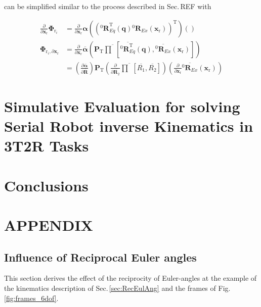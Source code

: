 \documentclass[twocolumn,10pt]{IFTOMM}
\newcommand{\bm}[1]{\boldsymbol{#1}}
\newcommand{\rotmat}[2]{{{ }^{#1}\boldsymbol{R}}_{#2}}
\newcommand{\transp}[0]{{\mathrm{T}}}
\begin{document}
can be simplified similar to the process described in Sec.\,REF with

\begin{align}
\frac{\partial}{\partial \bm{x}_{\mathrm{r}}}\bm{\Phi}_{\mathrm{r}_i}
&=
\frac{\partial}{\partial \bm{x}_{\mathrm{r}}} \bm{\alpha}\left((\rotmat{0}{Eq}^\transp(\bm{q}) \rotmat{0}{Ex}(\bm{x}_{\mathrm{r}}))^\transp\right) (\label{equ:grad_Phi_x}) \\
\bm{\Phi}_{\mathrm{r}_i,\partial \bm{x}_{\mathrm{r}}} 
&=
\frac{\partial}{\partial \bm{x}_{\mathrm{r}}} \overline{\bm{\alpha}}\left(
\bm{P}_{\mathrm{T}}
\overline{\prod}\left[ \overline{\rotmat{0}{Eq}^\transp}(\bm{q}), \overline{\rotmat{0}{Ex}}(\bm{x}_{\mathrm{r}})\right]\right) \nonumber \\
&=
\left(\frac{\partial \overline{\bm{\alpha}}}{\partial \overline{\bm{R}}}\right)
\bm{P}_{\mathrm{T}}
\left(\frac{\partial }{\partial \overline{\bm{R}_2}}
\overline{\prod}\left[ \overline{R_1}, \overline{R_2}\right]\right)
\left(\frac{\partial}{\partial \bm{x}_{\mathrm{r}}} \overline{\rotmat{0}{Ex}}(\bm{x}_{\mathrm{r}})\right) \nonumber
\end{align}





\section{Simulative Evaluation for solving Serial Robot inverse Kinematics in 3T2R Tasks}
\label{sec:SimEvalSerRobIK}

\section{Conclusions}
\label{sec:Conclusion}

\section{APPENDIX}

\subsection{Influence of Reciprocal Euler angles}
\label{sec:appendix_eulerreciproc}

This section derives the effect of the reciprocity of Euler-angles at the example of the kinematics description of Sec.\,\ref{sec:RecEulAng} and the frames of Fig.\,\ref{fig:frames_6dof}.
\end{document}
